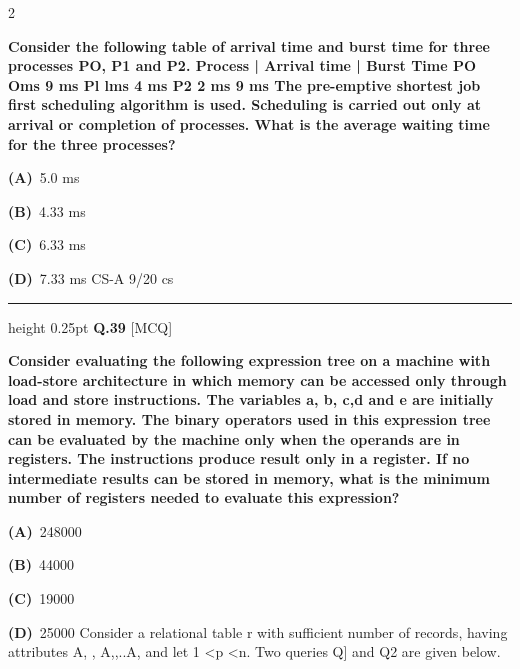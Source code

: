 \documentclass[a4paper,10pt,twoside]{article}
\begin{document}
\begin{multicols}{2}
{\bfseries Consider the following table of arrival time and burst time for three processes PO, P1 and P2.
Process | Arrival time | Burst Time
PO Oms 9 ms
Pl lms 4 ms
P2 2 ms 9 ms
The pre-emptive shortest job first scheduling algorithm is used. Scheduling is carried out only at
arrival or completion of processes. What is the average waiting time for the three processes? \par}
\par\vspace{2pt}\noindent
\textbf{(A)}~5.0 ms\par\vspace{2pt}\noindent
\textbf{(B)}~4.33 ms\par\vspace{2pt}\noindent
\textbf{(C)}~6.33 ms\par\vspace{2pt}\noindent
\textbf{(D)}~7.33 ms \newline CS-A 9/20  \newline cs
\par\vspace{6pt}\hrule height 0.25pt\vspace{6pt}
\noindent\textbf{Q.39} \hfill {\footnotesize\textsf{[MCQ]}}
\par\vspace{2pt}
{\bfseries Consider evaluating the following expression tree on a machine with load-store architecture in
which memory can be accessed only through load and store instructions. The variables a, b, c,d
and e are initially stored in memory. The binary operators used in this expression tree can be
evaluated by the machine only when the operands are in registers. The instructions produce result
only in a register. If no intermediate results can be stored in memory,
what is the minimum number
of registers needed to evaluate this expression? \par}
\par\vspace{2pt}\noindent
\textbf{(A)}~248000\par\vspace{2pt}\noindent
\textbf{(B)}~44000\par\vspace{2pt}\noindent
\textbf{(C)}~19000\par\vspace{2pt}\noindent
\textbf{(D)}~25000 \newline Consider a relational table r with sufficient number of records, having attributes A, , A,,..A, and \newline let 1 <p <n. Two queries Q] and Q2 are given below.

\end{multicols}
\end{document}
